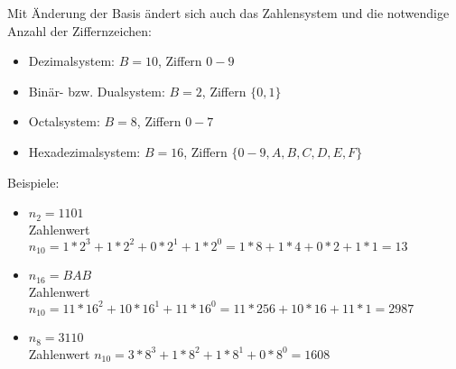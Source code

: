 \begin{bsslide}[\textbufferB]
  Mit \"Anderung der Basis \"andert sich auch das Zahlensystem und die notwendige Anzahl der Ziffernzeichen:
  \begin{itemize}
  \item Dezimalsystem: $B=10$, Ziffern $0-9$
  \item Bin\"ar- bzw. Dualsystem: $B=2$, Ziffern $\{0,1\}$
  \item Octalsystem: $B=8$, Ziffern $0-7$
  \item Hexadezimalsystem: $B=16$, Ziffern $\{0-9, A, B, C, D, E, F\}$
  \end{itemize}
  Beispiele: 
  \begin{itemize}
  \item $n_2=1101$\\
    Zahlenwert $n_{10}= 1*2^3+1*2^2+0*2^1+1*2^0=1*8+1*4+0*2+1*1=13$
  \item $n_{16}=BAB$\\
    Zahlenwert $n_{10}= 11*16^2+10*16^1+11*16^0=11*256+10*16+11*1 = 2987$
  \item $n_{8}=3110$\\ 
    Zahlenwert $n_{10}= 3*8^3+1*8^2+1*8^1+0*8^0=1608$
  \end{itemize}
\end{bsslide}

